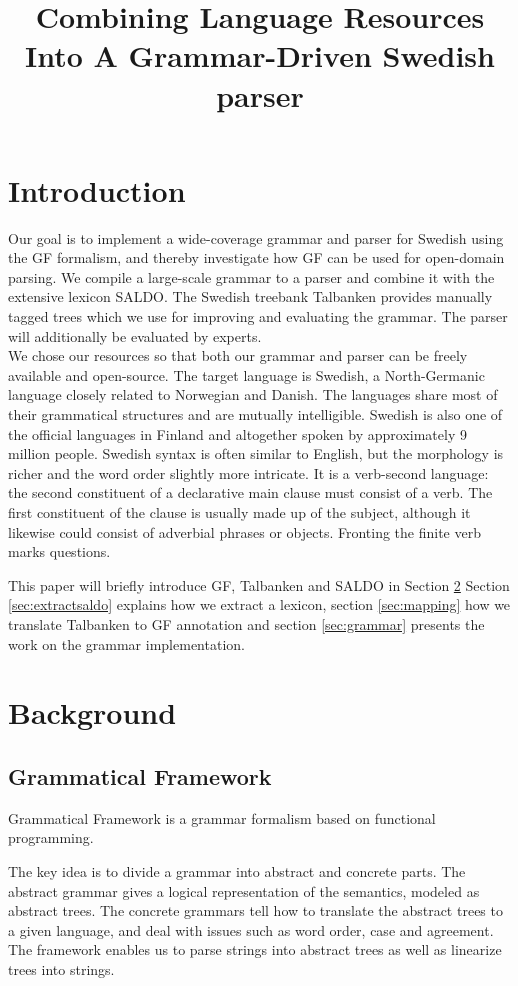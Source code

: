 \documentclass[10pt, a4paper]{article}
\title{Combining Language Resources Into A Grammar-Driven Swedish parser}
\begin{document}
\maketitleabstract


\section{Introduction}
Our goal is to implement a wide-coverage grammar and parser for Swedish
using the GF formalism, and 
thereby investigate how GF can be used for open-domain parsing.
We compile a large-scale grammar to a parser
and combine it with the extensive lexicon SALDO. The Swedish treebank 
Talbanken provides manually tagged trees which we use for improving and evaluating
the grammar. The parser will additionally
be evaluated by experts. \\
We chose our resources so that both our grammar and parser can 
be freely available and open-source. 
The target language is Swedish, a North-Germanic language
closely related to Norwegian and Danish. The languages share most of their
grammatical structures and are mutually intelligible. Swedish is also 
one of the official languages in Finland and altogether spoken by approximately 9
million people.
Swedish syntax is often similar to English, but the  morphology is richer and the
word order slightly more intricate.
It is a verb-second language: the second constituent of a declarative main
clause must consist of a verb.
The first constituent of the clause is usually made up of the subject,
although it likewise could consist of adverbial phrases or objects.
Fronting the finite verb marks questions.

This paper will briefly introduce GF, Talbanken and SALDO in Section \ref{sec:background}
Section \ref{sec:extractsaldo} explains how we extract a lexicon, section \ref{sec:mapping}
how we translate Talbanken to GF annotation and section \ref{sec:grammar}
presents the work on the grammar implementation.


\section{Background}
\label{sec:background}
\subsection{Grammatical Framework}
\label{sec:gf}


Grammatical Framework \cite{ranta-2011} is a grammar formalism based on
functional programming. 

The key idea is to divide a grammar into abstract and concrete parts. 
The abstract grammar gives a logical representation of the semantics,
modeled as abstract trees.
The concrete grammars tell how to translate the abstract trees to a given language,
and deal with issues such as word order, case and agreement. 
The framework enables us to parse strings into abstract trees as well as
linearize trees into strings.
\end{document}
